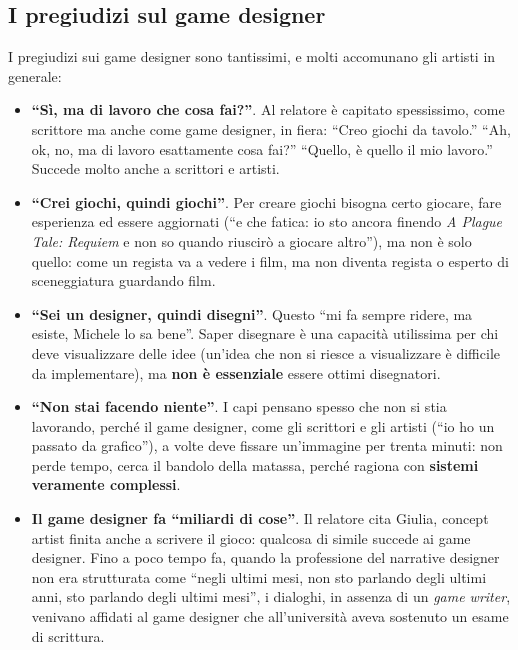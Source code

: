 \subsection{I pregiudizi sul game designer}

I pregiudizi sui game designer sono tantissimi, e molti accomunano gli
artisti in generale:
\begin{itemize}
  \item \textbf{``Sì, ma di lavoro che cosa fai?''}. Al relatore è capitato
        spessissimo, come scrittore ma anche come game designer, in fiera:
        ``Creo giochi da tavolo.'' ``Ah, ok, no, ma di lavoro esattamente cosa
        fai?'' ``Quello, è quello il mio lavoro.'' Succede molto anche a
        scrittori e artisti.
  \item \textbf{``Crei giochi, quindi giochi''}. Per creare giochi bisogna
        certo giocare, fare esperienza ed essere aggiornati (``e che fatica: io
        sto ancora finendo \emph{A Plague Tale: Requiem} e non so quando
        riuscirò a giocare altro''), ma non è solo quello: come un regista va a
        vedere i film, ma non diventa regista o esperto di sceneggiatura
        guardando film.
  \item \textbf{``Sei un designer, quindi disegni''}. Questo ``mi fa sempre
        ridere, ma esiste, Michele lo sa bene''. Saper disegnare è una capacità
        utilissima per chi deve visualizzare delle idee (un'idea che non si
        riesce a visualizzare è difficile da implementare), ma \textbf{non è
        essenziale} essere ottimi disegnatori.
  \item \textbf{``Non stai facendo niente''}. I capi pensano spesso che non si
        stia lavorando, perché il game designer, come gli scrittori e gli
        artisti (``io ho un passato da grafico''), a volte deve fissare
        un'immagine per trenta minuti: non perde tempo, cerca il bandolo della
        matassa, perché ragiona con \textbf{sistemi veramente complessi}.
  \item \textbf{Il game designer fa ``miliardi di cose''}. Il relatore cita
        Giulia, concept artist finita anche a scrivere il gioco: qualcosa di
        simile succede ai game designer. Fino a poco tempo fa, quando la
        professione del narrative designer non era strutturata come
        ``negli ultimi mesi, non sto parlando degli ultimi anni, sto parlando
        degli ultimi mesi'', i dialoghi, in assenza di un \emph{game writer},
        venivano affidati al game designer che all'università aveva sostenuto
        un esame di scrittura.
\end{itemize}

